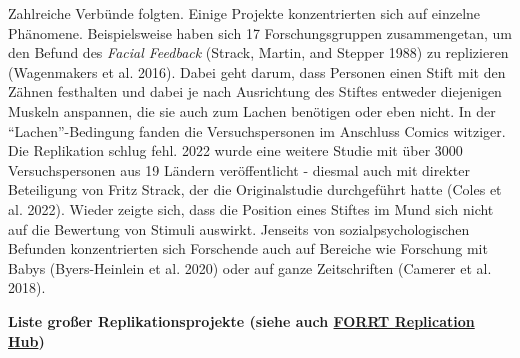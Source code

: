 \documentclass[
  letterpaper,
  DIV=11,
  numbers=noendperiod]{scrreprt}
\begin{document}
Zahlreiche Verbünde folgten. Einige Projekte konzentrierten sich auf
einzelne Phänomene. Beispielsweise haben sich 17 Forschungsgruppen
zusammengetan, um den Befund des \emph{Facial Feedback} (Strack, Martin,
and Stepper 1988) zu replizieren (Wagenmakers et al. 2016). Dabei geht
darum, dass Personen einen Stift mit den Zähnen festhalten und dabei je
nach Ausrichtung des Stiftes entweder diejenigen Muskeln anspannen, die
sie auch zum Lachen benötigen oder eben nicht. In der
``Lachen''-Bedingung fanden die Versuchspersonen im Anschluss Comics
witziger. Die Replikation schlug fehl. 2022 wurde eine weitere Studie
mit über 3000 Versuchspersonen aus 19 Ländern veröffentlicht - diesmal
auch mit direkter Beteiligung von Fritz Strack, der die Originalstudie
durchgeführt hatte (Coles et al. 2022). Wieder zeigte sich, dass die
Position eines Stiftes im Mund sich nicht auf die Bewertung von Stimuli
auswirkt. Jenseits von sozialpsychologischen Befunden konzentrierten
sich Forschende auch auf Bereiche wie Forschung mit Babys
(Byers-Heinlein et al. 2020) oder auf ganze Zeitschriften (Camerer et
al. 2018).

\textbf{Liste großer Replikationsprojekte (siehe auch
\href{https://forrt.org/replication-hub/}{FORRT Replication Hub})}
\end{document}
